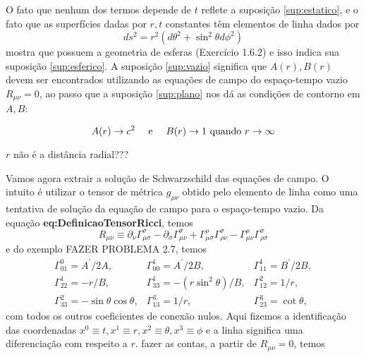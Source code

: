 O fato que nenhum dos termos depende de $t$ reflete a suposição \ref{sup:estatico}, e o fato que as superfícies dadas por $r,t$ constantes têm elementos de linha dados por
\begin{equation}\label{eq:RTConstantes}
	d s^{2}=r^{2}\left(d \theta^{2}+\sin ^{2} \theta d \phi^{2}\right)
\end{equation}
mostra que possuem a geometria de esferas {\color{red}(Exercício 1.6.2)} e isso indica sua suposição \ref{sup:esferico}. A suposição \ref{sup:vazio} significa que $A(r), B(r)$ devem ser encontrados utilizando as equações de campo do espaço-tempo vazio $R_{\mu\nu}=0$, ao passo que a suposição \ref{sup:plano} nos dá as condições de contorno em $A,B$:

\begin{equation}\label{eq:CondicoesContornoSchwarzschild}
	A(r) \rightarrow c^{2} \qq{ e } B(r) \rightarrow 1 \text { quando } r \rightarrow \infty
\end{equation}

{\color{red} $r$ não é a distância radial???}

Vamos agora extrair a solução de Schwarzschild das equações de campo. O intuito é utilizar o tensor de métrica $g_{\mu\nu}$ obtido pelo elemento de linha  como uma tentativa de solução da equação de campo para o espaço-tempo vazio. Da equação \textbf{eq:DefinicaoTensorRicci}, temos 
\[
R_{\mu \nu} \equiv \partial_{\nu} \Gamma_{\mu \sigma}^{\sigma}-\partial_{\sigma} \Gamma_{\mu \nu}^{\sigma}+\Gamma_{\mu \sigma}^{\rho} \Gamma_{\rho \nu}^{\sigma}-\Gamma_{\mu \nu}^{\rho} \Gamma_{\rho \sigma}^{\sigma}
\]
e do exemplo {\color{red} FAZER PROBLEMA 2.7}, temos
\[
\begin{array}{lll}
{\Gamma_{01}^{0}=A^{\prime} / 2 A,} & {\Gamma_{00}^{1}=A^{\prime} / 2 B,} & {\Gamma_{11}^{1}=B^{\prime} / 2 B,} \\ 
{\Gamma_{22}^{1}=-r / B,} & {\Gamma_{33}^{1}=-\left(r \sin ^{2} \theta\right) / B,} &{ \Gamma_{12}^{2}=1 / r,} \\ 
{\Gamma_{33}^{2}=-\sin \theta \cos \theta,} & {\Gamma_{13}^{3}=1 / r,} & {\Gamma_{23}^{3}=\cot \theta,}
\end{array}	
\]
com todos os outros coeficientes de conexão nulos. Aqui fizemos a identificação das coordenadas $x^0\equiv t, x^1\equiv r, x^2\equiv\theta,x^3\equiv\phi$ e a linha significa uma diferenciação com respeito a $r$. 
{\color{red} fazer as contas, a partir de $R_{\mu\nu}=0$}, temos

